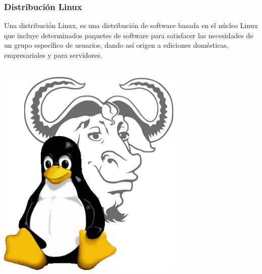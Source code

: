 \documentclass[9pt,t]{beamer}
\begin{document}
\begin{frame}\justifying
  \frametitle{Distribución Linux}
  Una distribución Linux, es una distribución de software basada en el núcleo Linux 
  que incluye determinados paquetes de software para satisfacer las necesidades de un grupo específico de usuarios, 
  dando así origen a ediciones domésticas, empresariales y para servidores.
  \ \\ \ \\ 
  \begin{center}
    \includegraphics[height=0.3\textheight]{images/04_gnulinux.png} \hspace*{0.0cm}
  \end{center} 
\end{frame}
\end{document}
